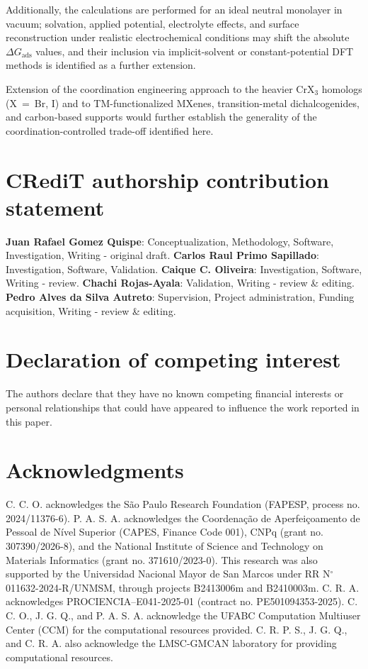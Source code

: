 \documentclass[journal=jacsat,manuscript=article]{achemso}
\begin{document}
{\color{revcolor}%
  Additionally, the calculations are performed for an ideal neutral monolayer in vacuum; solvation, applied potential, electrolyte effects, and surface reconstruction under realistic electrochemical conditions may shift the absolute $\Delta G_{\mathrm{ads}}$ values, and their inclusion via implicit-solvent or constant-potential DFT methods is identified as a further extension.
\par}

{\color{revcolor}%
  Extension of the coordination engineering approach to the heavier CrX$_3$ homologs (X~=~Br, I) and to TM-functionalized MXenes, transition-metal dichalcogenides, and carbon-based supports would further establish the generality of the coordination-controlled trade-off identified here.
\par}

\section*{CRediT authorship contribution statement}
\begin{sloppypar}
  \textbf{Juan Rafael Gomez Quispe}: Conceptualization, Methodology, Software, Investigation, Writing - original draft. \textbf{Carlos Raul Primo Sapillado}: Investigation, Software, Validation. \textbf{Caique C. Oliveira}: Investigation, Software, Writing - review. \textbf{Chachi Rojas-Ayala}: Validation, Writing - review \& editing. \textbf{Pedro Alves da Silva Autreto}: Supervision, Project administration, Funding acquisition, Writing - review \& editing.
\end{sloppypar}

\section*{Declaration of competing interest}
The authors declare that they have no known competing financial interests or personal relationships that could have appeared to influence the work reported in this paper.

\section*{Acknowledgments}

C. C. O. acknowledges the S\~ao Paulo Research Foundation (FAPESP, process no. 2024/11376-6). P. A. S. A. acknowledges the Coordena\c{c}\~ao de Aperfei\c{c}oamento de Pessoal de N\'ivel Superior (CAPES, Finance Code 001), CNPq (grant no. 307390/2026-8), and the National Institute of Science and Technology on Materials Informatics (grant no. 371610/2023-0). This research was also supported by the Universidad Nacional Mayor de San Marcos under RR N$^\circ$ 011632-2024-R/UNMSM, through projects B2413006m and B2410003m. C. R. A. acknowledges PROCIENCIA--E041-2025-01 (contract no. PE501094353-2025). C. C. O., J. G. Q., and P. A. S. A. acknowledge the UFABC Computation Multiuser Center (CCM) for the computational resources provided. C. R. P. S., J. G. Q., and C. R. A. also acknowledge the LMSC-GMCAN laboratory for providing computational resources.
\end{document}
